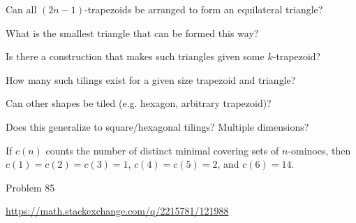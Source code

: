 \documentclass{article}
\begin{document}
\begin{question}
  Can all $(2n-1)$-trapezoids be arranged to form an equilateral triangle?
\end{question}

\begin{related}
  \item What is the smallest triangle that can be formed this way?
  \item Is there a construction that makes such triangles given some $k$-trapezoid?
  \item How many such tilings exist for a given size trapezoid and triangle?
  \item Can other shapes be tiled (e.g. hexagon, arbitrary trapezoid)?
  \item Does this generalize to square/hexagonal tilings? Multiple dimensions?
\end{related}

\begin{note}
  If $c(n)$ counts the number of distinct minimal covering sets of $n$-ominoes,
  then $c(1) = c(2) = c(3) = 1$, $c(4) = c(5) = 2$, and $c(6) = 14$.
\end{note}

\begin{references}
  \item Problem 85
  \item \url{https://math.stackexchange.com/q/2215781/121988}
\end{references}
\end{document}
